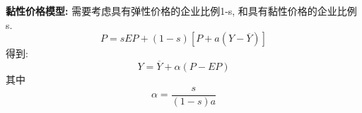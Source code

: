 \documentclass[UTF8, onecolumn, a4paper, 12pt]{article}
\begin{document}
\textbf{黏性价格模型:} 需要考虑具有弹性价格的企业比例1-s, 和具有黏性价格的企业比例s.
$$P = sEP + (1-s)[P + a(Y-\overline{Y})]$$
得到:
$$Y = \overline{Y} + \alpha(P-EP)$$
其中
$$\alpha = \frac{s}{(1-s)a}$$
\begin{center}
	\begin{figure}[htb] %
		\centering %
		\begin{minipage}[b]{0.95\linewidth}
			\
			\hfill
		\end{minipage}
	\end{figure}
\end{center}
\end{document}
